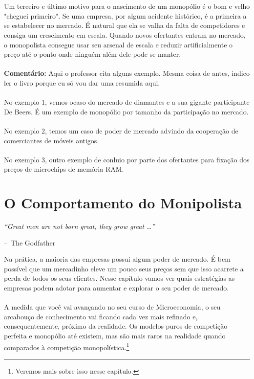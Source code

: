 \documentclass[a4paper,11pt,oneside]{book}
\makeatletter
\theoremstyle{definition}
\theoremstyle{break}
\newenvironment{chapquote}[2][2em]
  {\setlength{\@tempdima}{#1}%
   \def\chapquote@author{#2}%
   \parshape 1 \@tempdima \dimexpr\textwidth-2\@tempdima\relax%
   \itshape}
  {\par\normalfont\hfill--\ \chapquote@author\hspace*{\@tempdima}\par\bigskip}
\makeatother
\begin{document}
\\~\\
Um terceiro e último motivo para o nascimento de um monopólio é o bom e velho "cheguei primeiro". Se uma empresa, por algum acidente histórico, é a primeira a se estabelecer no mercado. É natural que ela se valha da falta de competidores e consiga um crescimento em escala. Quando novos ofertantes entram no mercado, o monopolista consegue usar seu arsenal de escala e reduzir artificialmente o preço até o ponto onde ninguém além dele pode se manter.
\\~\\
\textbf{Comentário:} Aqui o professor cita alguns exemplo. Mesma coisa de antes, indico ler o livro porque eu só vou dar uma resumida aqui.
\\~\\
No exemplo 1, vemos ocaso do mercado de diamantes e a sua gigante participante De Beers. É um exemplo de monopólio por tamanho da participação no mercado.
\\~\\
No exemplo 2, temos um caso de poder de mercado advindo da cooperação de comerciantes de móveis antigos.
\\~\\
No exemplo 3, outro exemplo de conluio por parte dos ofertantes para fixação dos preços de microchips de memória RAM.

\chapter{O Comportamento do Monipolista}

\begin{chapquote}{The Godfather}
	``Great men are not born great, they grow great \dots''
\end{chapquote}

Na prática, a maioria das empresas possui algum poder de mercado. É bem possível que um mercadinho eleve um pouco seus preços sem que isso acarrete a perda de todos os seus clientes. Nesse capítulo vamos ver quais estratégias as empresas podem adotar para aumentar e explorar o seu poder de mercado.
\\~\\
A medida que você vai avançando no seu curso de Microeconomia, o seu arcabouço de conhecimento vai ficando cada vez mais refinado e, consequentemente, próximo da realidade. Os modelos puros de competição perfeita e monopólio até existem, mas são mais raros na realidade quando comparados à competição monopolística.\footnote{Veremos mais sobre isso nesse capítulo.}
\end{document}
